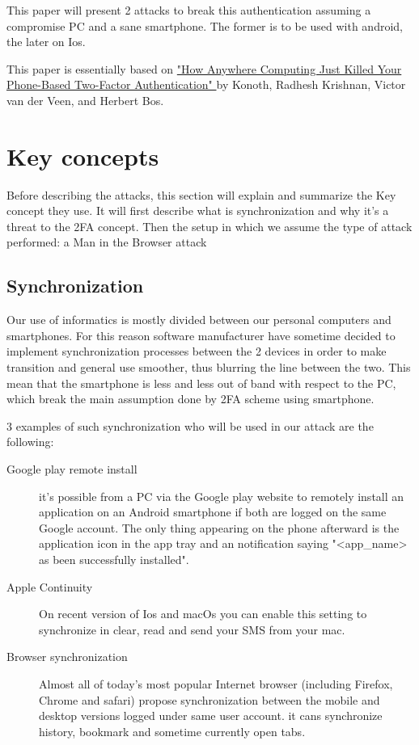 \documentclass[11pt, a4paper,twocolumn]{article}
\begin{document}
This paper will present 2 attacks to break this authentication assuming a compromise PC and a sane smartphone. The former is to be used with android, the later on Ios.

This paper is essentially based on \href{http://fc16.ifca.ai/preproceedings/24_Konoth.pdf}{"How Anywhere Computing Just Killed Your Phone-Based Two-Factor Authentication" } by  Konoth, Radhesh Krishnan, Victor van der Veen, and Herbert Bos. \cite{Base}

\section{Key concepts}
Before describing the attacks, this section will explain and summarize the Key concept they use. It will first describe what is synchronization and why it's a threat to the 2FA concept. Then the setup in which we assume the type of attack performed: a Man in the Browser attack
\subsection{Synchronization}
Our use of informatics is mostly divided between our personal computers 
and smartphones. For this reason software manufacturer have sometime decided to implement synchronization processes between the 2 devices in order to make transition and general use smoother, thus blurring the line between the two. This mean that the smartphone is less and less out of band with respect to the PC, which break the main assumption done by 2FA scheme using smartphone.

3 examples of such synchronization who will be used in our attack are the 
following:
\begin{description}
  \item[Google play remote install] it's possible from a PC via the Google play website to remotely install an application on an Android smartphone if both are logged on the same Google account. The only thing appearing on the phone afterward is the application icon in the app tray and an notification saying "<app\_name> as been successfully installed".
  
  \item[Apple Continuity] On recent version of Ios and macOs you can enable this setting to synchronize in clear, read and send your SMS from your mac.
  
  \item[Browser synchronization] Almost all of today's most popular Internet browser (including Firefox, Chrome and safari) propose synchronization between the mobile and desktop versions logged under same user account. it cans synchronize history, bookmark and sometime currently open tabs.
\end{description}
\end{document}
